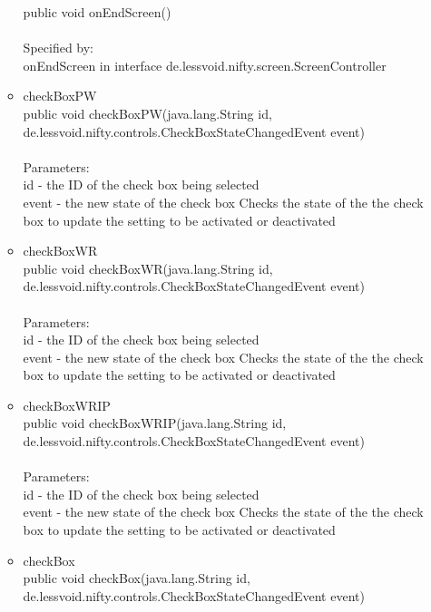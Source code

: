 \documentclass[letterpaper]{article}
\begin{document}
\begin{itemize}
\begin{itemize}
											public void onEndScreen() \\ \\
											Specified by: \\
											onEndScreen in interface de.lessvoid.nifty.screen.ScreenController
									\item	checkBoxPW \\
											public void checkBoxPW(java.lang.String id, \\
		              de.lessvoid.nifty.controls.CheckBoxStateChangedEvent event) \\ \\
											Parameters: \\
											id - the ID of the check box being selected \\
											event - the new state of the check box Checks the state of the the check box to update the setting to be activated or deactivated
									\item	checkBoxWR \\
											public void checkBoxWR(java.lang.String id, \\
		              de.lessvoid.nifty.controls.CheckBoxStateChangedEvent event) \\ \\
											Parameters: \\
											id - the ID of the check box being selected \\
											event - the new state of the check box Checks the state of the the check box to update the setting to be activated or deactivated
									\item	checkBoxWRIP \\
											public void checkBoxWRIP(java.lang.String id, \\
		                de.lessvoid.nifty.controls.CheckBoxStateChangedEvent event) \\ \\
											Parameters: \\
											id - the ID of the check box being selected \\
											event - the new state of the check box Checks the state of the the check box to update the setting to be activated or deactivated
									\item	checkBox \\
											public void checkBox(java.lang.String id, \\
		            de.lessvoid.nifty.controls.CheckBoxStateChangedEvent event) \\ \\

\end{itemize}
\end{itemize}
\end{document}

